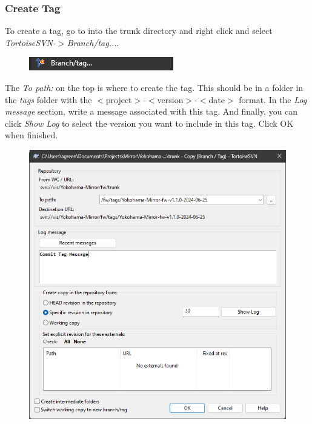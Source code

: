 \documentclass[10pt]{article}
\begin{document}
            \subsubsection{Create Tag}
                To create a tag, go to into the trunk directory and right click and select \emph{TortoiseSVN-$>$Branch/tag...}.
                \begin{figure}[H]
                    \centerline{\includegraphics{References/Tag.png}}
                \end{figure}
                The \emph{To path:} on the top is where to create the tag. This should be in a folder in the \emph{tags} folder with the $<$project$>$-$<$version$>$-$<$date$>$ format. In the \emph{Log message} section, write a message associated with this tag. And finally, you can click \emph{Show Log} to select the version you want to include in this tag. Click OK when finished.
                \begin{figure}[H]
                    \centerline{\includegraphics[width=\textwidth]{References/Tag Window.png}}
                \end{figure}
\end{document}
